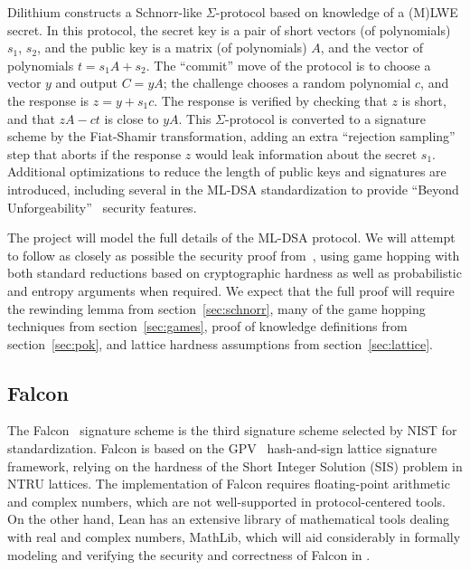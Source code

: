 Dilithium constructs a Schnorr-like $\Sigma$-protocol based on knowledge of a (M)LWE secret.
In this protocol, the secret key is a pair of short vectors (of polynomials) $s_1$, $s_2$, and the public key is a matrix (of polynomials) $A$, and the vector of polynomials $t = s_1A + s_2$.
The ``commit'' move of the protocol is to choose a vector $y$ and output $C = yA$; the challenge chooses a random polynomial $c$, and the response is $z = y + s_1c$.
The response is verified by checking that $z$ is short, and that $zA - ct$ is close to $yA$.
This $\Sigma$-protocol is converted to a signature scheme by the Fiat-Shamir transformation, adding an extra ``rejection sampling'' step that aborts if the response $z$ would leak information about the secret $s_1$.
Additional optimizations to reduce the length of public keys and signatures are introduced, including several in the ML-DSA standardization to provide ``Beyond Unforgeability''~\cite{BUFF} security features.

The project will model the full details of the ML-DSA protocol.
We will attempt to follow as closely as possible the security proof from~\cite{dilithium3}, using game hopping with both standard reductions based on cryptographic hardness as well as probabilistic and entropy arguments when required.
We expect that the full proof will require the rewinding lemma from section~\ref{sec:schnorr}, many of the game hopping techniques from section~\ref{sec:games}, proof of knowledge definitions from section~\ref{sec:pok}, and lattice hardness assumptions from section~\ref{sec:lattice}.


\subsection{Falcon}\label{sec:falcon}

The Falcon~\cite{fouque2018falcon} signature scheme is the third signature scheme selected by NIST for standardization.
Falcon is based on the GPV~\cite{GPV} hash-and-sign lattice signature framework, relying on the hardness of the Short Integer Solution (SIS) problem in NTRU lattices.
The implementation of Falcon requires floating-point arithmetic and complex numbers, which are not well-supported in protocol-centered tools.
On the other hand, Lean has an extensive library of mathematical tools dealing with real and complex numbers,  MathLib, which will aid considerably in formally modeling and verifying the security and correctness of Falcon in \vcvio.


